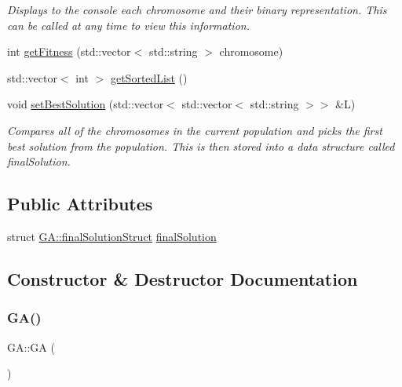 \begin{DoxyCompactItemize}
\begin{DoxyCompactList}\small\item\em Displays to the console each chromosome and their binary representation. This can be called at any time to view this information. \end{DoxyCompactList}\item 
int \hyperlink{class_g_a_a1410614c7bc1e10f428039e95b5056bc}{get\+Fitness} (std\+::vector$<$ std\+::string $>$ chromosome)
\item 
std\+::vector$<$ int $>$ \hyperlink{class_g_a_aae44c594b59257c78ea06d1811cfef98}{get\+Sorted\+List} ()
\item 
void \hyperlink{class_g_a_a7456fb3da49960949c9e4fce3939182a}{set\+Best\+Solution} (std\+::vector$<$ std\+::vector$<$ std\+::string $>$$>$ \&L)
\begin{DoxyCompactList}\small\item\em Compares all of the chromosomes in the current population and picks the first best solution from the population. This is then stored into a data structure called final\+Solution. \end{DoxyCompactList}\end{DoxyCompactItemize}
\subsection*{Public Attributes}
\begin{DoxyCompactItemize}
\item 
struct \hyperlink{struct_g_a_1_1final_solution_struct}{G\+A\+::final\+Solution\+Struct} \hyperlink{class_g_a_a301e86430cdc9d3af98d85267fb0f963}{final\+Solution}
\end{DoxyCompactItemize}


\subsection{Constructor \& Destructor Documentation}
\hypertarget{class_g_a_a754149f21a0440f8078abb48f1c88ef3}{}\label{class_g_a_a754149f21a0440f8078abb48f1c88ef3} 
\subsubsection{\texorpdfstring{G\+A()}{GA()}\hspace{0.1cm}{\footnotesize\ttfamily [1/2]}}
{\footnotesize\ttfamily G\+A\+::\+GA (\begin{DoxyParamCaption}{ }\end{DoxyParamCaption})}



